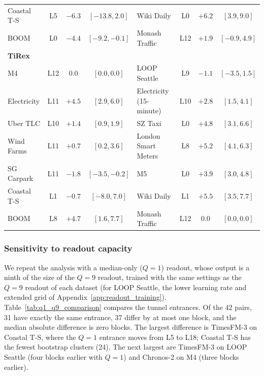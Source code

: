 \documentclass{article} %
\begin{document}
\begin{table}[p]
\begin{tabular}{@{}lccc@{\qquad}lccc@{}}
  Coastal T-S & L5 & $-6.3$ & $[-13.8, 2.0]$ &
  Wiki Daily & L0 & $+6.2$ & $[3.9, 9.0]$ \\
  BOOM & L0 & $-4.4$ & $[-9.2, -0.1]$ &
  Monash Traffic & L12 & $+1.9$ & $[-0.9, 4.9]$ \\
  \midrule
  \multicolumn{8}{l}{\textbf{TiRex}} \\
  M4 & L12 & $0.0$ & $[0.0, 0.0]$ &
  LOOP Seattle & L9 & $-1.1$ & $[-3.5, 1.5]$ \\
  Electricity & L11 & $+4.5$ & $[2.9, 6.0]$ &
  Electricity (15-minute) & L10 & $+2.8$ & $[1.5, 4.1]$ \\
  Uber TLC & L10 & $+1.4$ & $[0.9, 1.9]$ &
  SZ Taxi & L0 & $+4.8$ & $[3.1, 6.6]$ \\
  Wind Farms & L11 & $+0.7$ & $[0.2, 3.6]$ &
  London Smart Meters & L8 & $+5.2$ & $[4.1, 6.3]$ \\
  SG Carpark & L11 & $-1.8$ & $[-3.5, -0.2]$ &
  M5 & L0 & $+3.9$ & $[3.0, 4.8]$ \\
  Coastal T-S & L1 & $-0.7$ & $[-8.0, 7.0]$ &
  Wiki Daily & L1 & $+5.5$ & $[3.5, 7.7]$ \\
  BOOM & L8 & $+4.7$ & $[1.6, 7.7]$ &
  Monash Traffic & L12 & $0.0$ & $[0.0, 0.0]$ \\
  \bottomrule
  \end{tabular}
\end{table}

\subsubsection{Sensitivity to readout capacity}
\label{sec:app_q1_robustness}

We repeat the analysis with a median-only ($Q=1$) readout, whose output is a ninth of the size of the $Q=9$ readout, trained with the same settings as the $Q=9$ readout of each dataset (for LOOP Seattle, the lower learning rate and extended grid of Appendix~\ref{app:readout_training}). Table~\ref{tab:q1_q9_comparison} compares the tunnel entrances. Of the 42 pairs, 31 have exactly the same entrance, 37 differ by at most one block, and the median absolute difference is zero blocks. The largest difference is TimesFM-3 on Coastal T-S, where the $Q=1$ entrance moves from L5 to L18; Coastal T-S has the fewest bootstrap clusters (24). The next largest are TimesFM-3 on LOOP Seattle (four blocks earlier with $Q=1$) and Chronos-2 on M4 (three blocks earlier).
\end{document}

